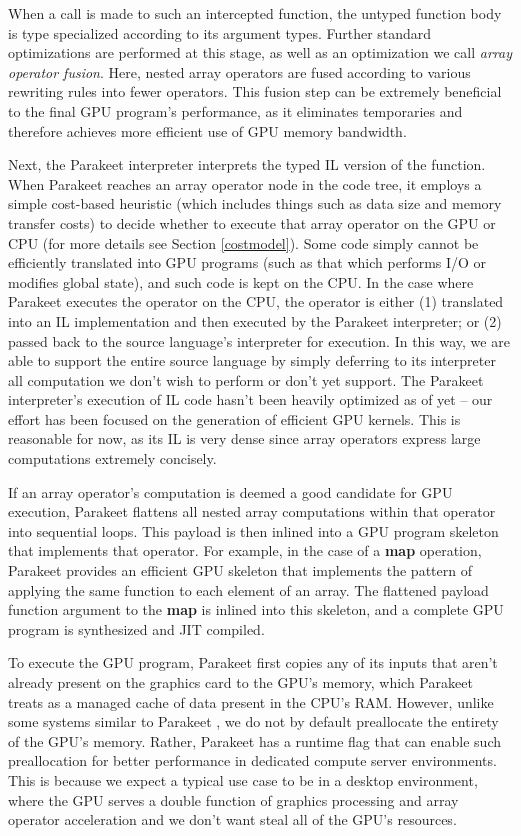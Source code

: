 \documentclass[preprint]{sigplanconf}
\begin{document}
When a call is made to such an intercepted function, the untyped function body is type specialized according to its argument types.  Further standard optimizations are performed at this stage, as well as an optimization we call \emph{array operator fusion}.  Here, nested array operators are fused according to various rewriting rules into fewer operators. This fusion step can be extremely beneficial to the final GPU program's performance, as it eliminates temporaries and therefore achieves more efficient use of GPU memory bandwidth.

Next, the Parakeet interpreter interprets the typed IL version of the function.  When Parakeet reaches an array operator node in the code tree, it employs a simple cost-based heuristic (which includes things such as data size and memory transfer costs) to decide whether to execute that array operator on the GPU or CPU (for more details see Section \ref{costmodel}).  Some code simply cannot be efficiently translated into GPU programs (such as that which performs I/O or modifies global state), and such code is kept on the CPU. In the case where Parakeet executes the operator on the CPU, the operator is either (1) translated into an IL implementation and then executed by the Parakeet interpreter; or (2) passed back to the source language's interpreter for execution. In this way, we are able to support the entire source language by simply deferring to its interpreter all computation we don't wish to perform or don't yet support. The Parakeet interpreter's execution of IL code hasn't been heavily optimized as of yet -- our effort has been focused on the generation of efficient GPU kernels.  This is reasonable for now, as its IL is very dense since array operators express large computations extremely concisely.

If an array operator's computation is deemed a good candidate for GPU execution, Parakeet flattens all nested array computations within that operator into sequential loops.  This payload is then inlined into a GPU program skeleton that implements that operator.  For example, in the case of a \textbf{map} operation, Parakeet provides an efficient GPU skeleton that implements the pattern of applying the same function to each element of an array.  The flattened payload function argument to the \textbf{map} is inlined into this skeleton, and a complete GPU program is synthesized and JIT compiled.

To execute the GPU program, Parakeet first copies any of its inputs that aren't already present on the graphics card to the GPU's memory, which Parakeet treats as a managed cache of data present in the CPU's RAM.  However, unlike some systems similar to Parakeet \cite{Chaf11}, we do not by default preallocate the entirety of the GPU's memory.  Rather, Parakeet has a runtime flag that can enable such preallocation for better performance in dedicated compute server environments.  This is because we expect a typical use case to be in a desktop environment, where the GPU serves a double function of graphics processing and array operator acceleration and we don't want steal all of the GPU's resources.
\end{document}
